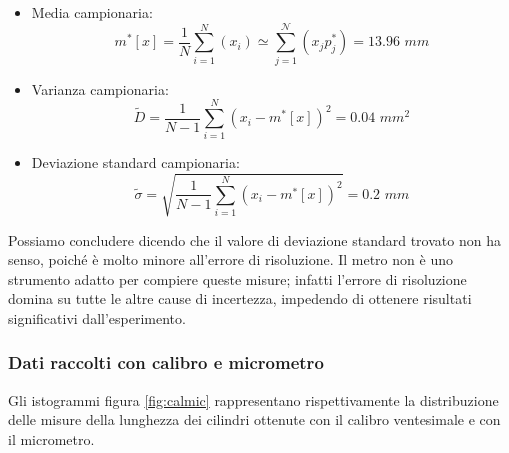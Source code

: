 \begin{itemize}
    \item{Media campionaria:}
        \begin{equation}
        m^*[x] = \frac{1}{N} \sum_{i=1}^{N} (x_i) \simeq \sum_{j=1}^{\mathcal{N}} (x_j p_j^*) = 13.96\,\,mm 
        \end{equation}

    \item{Varianza campionaria:}
        \begin{equation}
        \tilde{D} = \frac{1}{N - 1} \sum_{i=1}^{N} (x_i - m^*[x])^2 = 0.04\,\,mm^2
        \end{equation}

    \item{Deviazione standard campionaria:}
        \begin{equation}
        \tilde{\sigma} = \sqrt{\frac{1}{N - 1} \sum_{i=1}^{N} (x_i - m^*[x])^2} = 0.2\,\,mm
        \end{equation}
\end{itemize}

Possiamo concludere dicendo che il valore di deviazione standard trovato non ha
senso, poiché è molto minore all'errore di risoluzione. Il metro non è
uno strumento adatto per compiere queste misure; infatti l'errore di risoluzione domina su
tutte le altre cause di incertezza, impedendo di ottenere risultati significativi
dall'esperimento.

\subsubsection{Dati raccolti con calibro e micrometro}

Gli istogrammi figura \ref{fig:calmic} rappresentano rispettivamente la distribuzione delle
misure della lunghezza dei cilindri ottenute con il calibro ventesimale e con
il micrometro.

